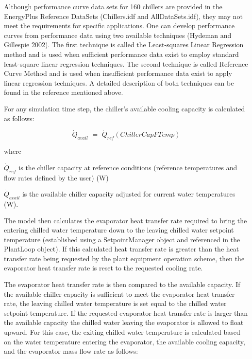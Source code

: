 Although performance curve data sets for 160 chillers are provided in the EnergyPlus Reference DataSets (Chillers.idf and AllDataSets.idf), they may not meet the requirements for specific applications. One can develop performance curves from performance data using two available techniques (Hydeman and Gillespie 2002). The first technique is called the Least-squares Linear Regression method and is used when sufficient performance data exist to employ standard least-square linear regression techniques. The second technique is called Reference Curve Method and is used when insufficient performance data exist to apply linear regression techniques. A detailed description of both techniques can be found in the reference mentioned above.

For any simulation time step, the chiller's available cooling capacity is calculated as follows:

\begin{equation}
{\dot{Q}_{avail}}\,\, = \,\,{\dot{Q}_{ref}}\left( {ChillerCapFTemp} \right)
\end{equation}

where

\({\dot{Q}_{ref}}\) is the chiller capacity at reference conditions (reference temperatures and flow rates defined by the user) (W)

\({\dot{Q}_{avail}}\) is the available chiller capacity adjusted for current water temperatures (W).

The model then calculates the evaporator heat transfer rate required to bring the entering chilled water temperature down to the leaving chilled water setpoint temperature (established using a SetpointManager object and referenced in the PlantLoop object). If this calculated heat transfer rate is greater than the heat transfer rate being requested by the plant equipment operation scheme, then the evaporator heat transfer rate is reset to the requested cooling rate.

The evaporator heat transfer rate is then compared to the available capacity. If the available chiller capacity is sufficient to meet the evaporator heat transfer rate, the leaving chilled water temperature is set equal to the chilled water setpoint temperature. If the requested evaporator heat transfer rate is larger than the available capacity the chilled water leaving the evaporator is allowed to float upward. For this case, the exiting chilled water temperature is calculated based on the water temperature entering the evaporator, the available cooling capacity, and the evaporator mass flow rate as follows:

